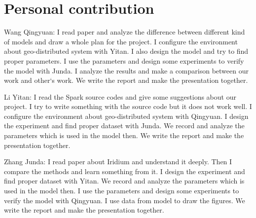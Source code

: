 \documentclass[base.tex]{subfiles}
\begin{document}
\section{Personal contribution}
Wang Qingyuan: I read paper and analyze the difference between different kind of models and draw a whole plan for the project. I configure the environment about geo-distributed system with Yitan. I also design the model and try to find proper parameters. I use the parameters and design some experiments to verify the model with Junda. I analyze the results and make a comparison between our work and other`s work. We write the report and make the presentation together.

Li Yitan: I read the Spark source codes and give some suggestions about our project. I try to write something with the source code but it does not work well. I configure the environment about geo-distributed system with Qingyuan. I design the experiment and find proper dataset with Junda. We record and analyze the parameters which is used in the model then. We write the report and make the presentation together.

Zhang Junda: I read paper about Iridium and understand it deeply. Then I compare the methods and learn something from it. I design the experiment and find proper dataset with Yitan. We record and analyze the parameters which is used in the model then. I use the parameters and design some experiments to verify the model with Qingyuan. I use data from model to draw the figures. We write the report and make the presentation together.
\end{document}

